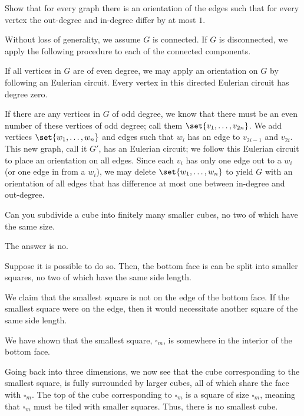 \documentclass[10pt]{mypackage}
\begin{document}
\begin{problem}
Show that for every graph there is an orientation of the edges such that for every vertex the out-degree and in-degree differ by at most $1$.
\end{problem}
\begin{solution}
  Without loss of generality, we assume $G$ is connected. If $G$ is disconnected, we apply the following procedure to each of the connected components.\newline

  If all vertices in $G$ are of even degree, we may apply an orientation on $G$ by following an Eulerian circuit. Every vertex in this directed Eulerian circuit has degree zero.\newline

  If there are any vertices in $G$ of odd degree, we know that there must be an even number of these vertices of odd degree; call them $\set{v_1,\dots,v_{2n}}$. We add vertices $\set{w_1,\dots,w_n}$ and edges such that $w_i$ has an edge to $v_{2i-1}$ and $v_{2i}$. This new graph, call it $G'$, has an Eulerian circuit; we follow this Eulerian circuit to place an orientation on all edges. Since each $v_i$ has only one edge out to a $w_i$ (or one edge in from a $w_i$), we may delete $\set{w_1,\dots,w_n}$ to yield $G$ with an orientation of all edges that has difference at most one between in-degree and out-degree.
\end{solution}
\begin{problem}
Can you subdivide a cube into finitely many smaller cubes, no two of which have the same size.
\end{problem}
\begin{solution}
  The answer is no.\newline

  Suppose it is possible to do so. Then, the bottom face is can be split into smaller squares, no two of which have the same side length.\newline

  We claim that the smallest square is not on the edge of the bottom face. If the smallest square were on the edge, then it would necessitate another square of the same side length.\newline

  We have shown that the smallest square, $\square_m$, is somewhere in the interior of the bottom face.\newline

  Going back into three dimensions, we now see that the cube corresponding to the smallest square, is fully surrounded by larger cubes, all of which share the face with $\square_m$. The top of the cube corresponding to $\square_m$ is a square of size $\square_m$, meaning that $\square_m$ must be tiled with smaller squares. Thus, there is no smallest cube.
\end{solution}
\end{document}
